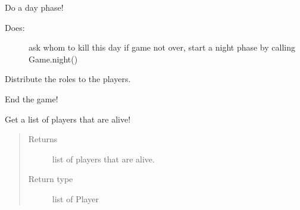 \documentclass[letterpaper,10pt,english]{sphinxmanual}
\begin{document}
\begin{fulllineitems}
\begin{fulllineitems}
\end{fulllineitems}


\begin{fulllineitems}
\label{\detokenize{chatwolf:chatwolf.game.Game.day}}
Do a day phase!
\begin{description}
\item[{Does:}] \leavevmode
ask whom to kill this day
if game not over, start a night phase by calling Game.night()

\end{description}

\end{fulllineitems}


\begin{fulllineitems}
\label{\detokenize{chatwolf:chatwolf.game.Game.dist_roles}}
Distribute the roles to the players.

\end{fulllineitems}


\begin{fulllineitems}
\label{\detokenize{chatwolf:chatwolf.game.Game.end}}
End the game!

\end{fulllineitems}


\begin{fulllineitems}
\label{\detokenize{chatwolf:chatwolf.game.Game.get_alive}}
Get a list of players that are alive!
\begin{quote}\begin{description}
\item[{Returns}] \leavevmode
list of players that are alive.

\item[{Return type}] \leavevmode
list of Player


\end{description}
\end{quote}
\end{fulllineitems}
\end{fulllineitems}
\end{document}
